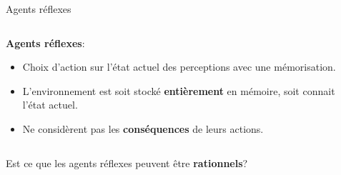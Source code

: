 \documentclass{beamer}
\begin{document}
\begin{frame}[t]{Agents réflexes}
  
  \begin{columns}
    \begin{column}{0.5\textwidth}
      
      \alert{\textbf{Agents réflexes}}:
    
      \begin{itemize}
        \scriptsize
      \item<2-> Choix d'action sur l'état actuel des perceptions avec une
        mémorisation.\\[1cm]
      \item<3->  L'environnement est soit stocké \textbf{entièrement} en
        mémoire, soit connait l'état actuel.\\[1cm]

      \item<4-> Ne considèrent pas les \alert{\textbf{conséquences}} de leurs actions.
      \end{itemize}
    \end{column}
    \begin{column}{0.5\textwidth}
    \end{column}
  \end{columns}

  \vspace*{1cm}

{
  \begin{block}{}
   \large \centering
   Est ce que les agents réflexes peuvent être \textbf{rationnels}?
  \end{block}
}
\end{frame}

\end{document}
